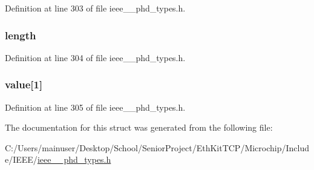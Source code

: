 Definition at line 303 of file ieee\+\_\+\_\+phd\+\_\+types.\+h.

\hypertarget{struct___handle_attr_val_map_a3743679e4ff85e3e1b3fc2e59973fbb3}{}
\subsubsection[{length}]{ length}\label{struct___handle_attr_val_map_a3743679e4ff85e3e1b3fc2e59973fbb3}


Definition at line 304 of file ieee\+\_\+\_\+phd\+\_\+types.\+h.

\hypertarget{struct___handle_attr_val_map_af2e7a3794cf60c619f935b4782828313}{}
\subsubsection[{value}]{ value\mbox{[}1\mbox{]}}\label{struct___handle_attr_val_map_af2e7a3794cf60c619f935b4782828313}


Definition at line 305 of file ieee\+\_\+\_\+phd\+\_\+types.\+h.



The documentation for this struct was generated from the following file\+:\begin{DoxyCompactItemize}
\item 
C\+:/\+Users/mainuser/\+Desktop/\+School/\+Senior\+Project/\+Eth\+Kit\+T\+C\+P/\+Microchip/\+Include/\+I\+E\+E\+E/\hyperlink{ieee__11073__phd__types_8h}{ieee\+\_\+\_\+phd\+\_\+types.\+h}\end{DoxyCompactItemize}
